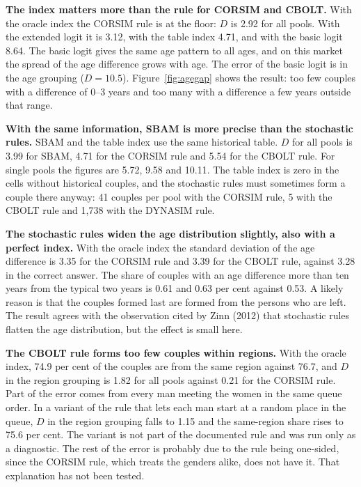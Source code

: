 \documentclass[12pt,a4paper]{article}
\begin{document}
\textbf{The index matters more than the rule for CORSIM and CBOLT.} With the oracle index the
CORSIM rule is at the floor: $D$ is 2.92 for all pools. With the extended logit it is 3.12, with
the table index 4.71, and with the basic logit 8.64. The basic logit gives the same age pattern
to all ages, and on this market the spread of the age difference grows with age. The error of the
basic logit is in the age grouping ($D = 10.5$). Figure~\ref{fig:agegap} shows the result: too
few couples with a difference of 0--3 years and too many with a difference a few years outside
that range.

\textbf{With the same information, SBAM is more precise than the stochastic rules.} SBAM and the
table index use the same historical table. $D$ for all pools is 3.99 for SBAM, 4.71 for the
CORSIM rule and 5.54 for the CBOLT rule. For single pools the figures are 5.72, 9.58 and 10.11.
The table index is zero in the cells without historical couples, and the stochastic rules must
sometimes form a couple there anyway: 41 couples per pool with the CORSIM rule, 5 with the CBOLT
rule and 1,738 with the DYNASIM rule.

\textbf{The stochastic rules widen the age distribution slightly, also with a perfect index.}
With the oracle index the standard deviation of the age difference is 3.35 for the CORSIM rule
and 3.39 for the CBOLT rule, against 3.28 in the correct answer. The share of couples with an age
difference more than ten years from the typical two years is 0.61 and 0.63 per cent against
0.53. A likely reason is that the couples formed last are formed from the persons who are left.
The result agrees with the observation cited by Zinn (2012) that stochastic rules flatten the age
distribution, but the effect is small here.

\textbf{The CBOLT rule forms too few couples within regions.} With the oracle index, 74.9 per
cent of the couples are from the same region against 76.7, and $D$ in the region grouping is 1.82
for all pools against 0.21 for the CORSIM rule. Part of the error comes from every man meeting
the women in the same queue order. In a variant of the rule that lets each man start at a random
place in the queue, $D$ in the region grouping falls to 1.15 and the same-region share rises to
75.6 per cent. The variant is not part of the documented rule and was run only as a diagnostic.
The rest of the error is probably due to the rule being one-sided, since the CORSIM rule, which
treats the genders alike, does not have it. That explanation has not been tested.
\end{document}
